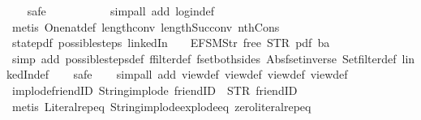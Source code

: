 \begin{isabellebody}
\ \ \isamarkupfalse%
\ safe\isanewline
\ \ \ \ \ \ \ \ \ \isamarkupfalse%
\ {\isacharparenleft}simp{\isacharunderscore}all\ add{\isacharcolon}\ login{\isacharunderscore}def{\isacharparenright}\isanewline
\ \ \isamarkupfalse%
\ {\isacharparenleft}metis\ One{\isacharunderscore}nat{\isacharunderscore}def\ length{\isacharunderscore}{}{\isacharunderscore}conv\ length{\isacharunderscore}Suc{\isacharunderscore}conv\ nth{\isacharunderscore}Cons{\isacharunderscore}{}{\isacharparenright}%
\endisatagproof
{\isafoldproof}%
%
\isadelimproof
\isanewline
%
\endisadelimproof
\isanewline
{}\isamarkupfalse%
\ state{\isacharunderscore}{}{\isacharunderscore}pdf{\isacharcolon}\ {\isachardoublequoteopen}possible{\isacharunderscore}steps\ linkedIn\ {}\ {\isacharless}{}\ {\isacharcolon}{\isacharequal}\ EFSM{\isachardot}Str\ {\isacharprime}{\isacharprime}free{\isacharprime}{\isacharprime}{\isachargreater}\ STR\ {\isacharprime}{\isacharprime}pdf{\isacharprime}{\isacharprime}\ ba\ {\isacharequal}\ {\isacharbraceleft}{\isacharbar}{\isacharbar}{\isacharbraceright}{\isachardoublequoteclose}\isanewline
%
\isadelimproof
\ \ %
\endisadelimproof
%
\isatagproof
{}\isamarkupfalse%
\ {\isacharparenleft}simp\ add{\isacharcolon}\ possible{\isacharunderscore}steps{\isacharunderscore}def\ ffilter{\isacharunderscore}def\ fset{\isacharunderscore}both{\isacharunderscore}sides\ Abs{\isacharunderscore}fset{\isacharunderscore}inverse\ Set{\isachardot}filter{\isacharunderscore}def\ linkedIn{\isacharunderscore}def{\isacharparenright}\isanewline
\ \ \isamarkupfalse%
\ safe\isanewline
\ \ \isamarkupfalse%
\ {\isacharparenleft}simp{\isacharunderscore}all\ add{\isacharcolon}\ view{\isacharunderscore}def\ view{}{\isacharunderscore}def\ view{}{\isacharunderscore}def\ view{}{\isacharunderscore}def{\isacharparenright}%
\endisatagproof
{\isafoldproof}%
%
\isadelimproof
\isanewline
%
\endisadelimproof
\isanewline
{}\isamarkupfalse%
\ implode{\isacharunderscore}friendID{\isacharcolon}\ {\isachardoublequoteopen}String{\isachardot}implode\ {\isacharprime}{\isacharprime}friendID{\isacharprime}{\isacharprime}\ {\isacharequal}\ STR\ {\isacharprime}{\isacharprime}friendID{\isacharprime}{\isacharprime}{\isachardoublequoteclose}\isanewline
%
\isadelimproof
\ \ %
\endisadelimproof
%
\isatagproof
{}\isamarkupfalse%
\ {\isacharparenleft}metis\ Literal{\isachardot}rep{\isacharunderscore}eq\ String{\isachardot}implode{\isacharunderscore}explode{\isacharunderscore}eq\ zero{\isacharunderscore}literal{\isachardot}rep{\isacharunderscore}eq{\isacharparenright}%

\end{isabellebody}
